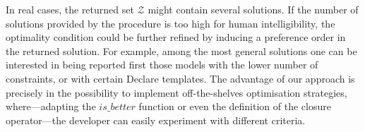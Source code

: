 \documentclass[a4wide,11pt]{article}
\theoremstyle{definition}
\theoremstyle{plain}
\begin{document}
%

In real cases, the returned set $\mathcal{Z}$ might contain several solutions. %
If the number of solutions provided by the procedure is too high for human intelligibility, the optimality condition could be further refined by inducing a preference order in the returned solution. For example, among the most general solutions one can be interested in being reported first those models with the lower number of constraints, or with certain Declare templates. The advantage of our approach is precisely in the possibility to implement off-the-shelves optimisation strategies, where---adapting the $is\_better$ function or even the definition of the closure operator---the developer can easily experiment with different criteria.
\end{document}
